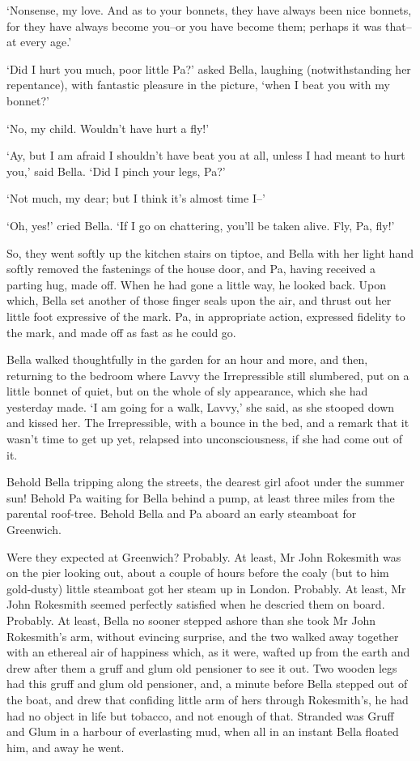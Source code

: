 ‘Nonsense, my love. And as to your bonnets, they have always been nice
bonnets, for they have always become you--or you have become them;
perhaps it was that--at every age.’

‘Did I hurt you much, poor little Pa?’ asked Bella, laughing
(notwithstanding her repentance), with fantastic pleasure in the
picture, ‘when I beat you with my bonnet?’

‘No, my child. Wouldn’t have hurt a fly!’

‘Ay, but I am afraid I shouldn’t have beat you at all, unless I had
meant to hurt you,’ said Bella. ‘Did I pinch your legs, Pa?’

‘Not much, my dear; but I think it’s almost time I--’

‘Oh, yes!’ cried Bella. ‘If I go on chattering, you’ll be taken alive.
Fly, Pa, fly!’

So, they went softly up the kitchen stairs on tiptoe, and Bella with
her light hand softly removed the fastenings of the house door, and Pa,
having received a parting hug, made off. When he had gone a little way,
he looked back. Upon which, Bella set another of those finger seals upon
the air, and thrust out her little foot expressive of the mark. Pa, in
appropriate action, expressed fidelity to the mark, and made off as fast
as he could go.

Bella walked thoughtfully in the garden for an hour and more, and then,
returning to the bedroom where Lavvy the Irrepressible still slumbered,
put on a little bonnet of quiet, but on the whole of sly appearance,
which she had yesterday made. ‘I am going for a walk, Lavvy,’ she said,
as she stooped down and kissed her. The Irrepressible, with a bounce in
the bed, and a remark that it wasn’t time to get up yet, relapsed into
unconsciousness, if she had come out of it.

Behold Bella tripping along the streets, the dearest girl afoot under
the summer sun! Behold Pa waiting for Bella behind a pump, at least
three miles from the parental roof-tree. Behold Bella and Pa aboard an
early steamboat for Greenwich.

Were they expected at Greenwich? Probably. At least, Mr John Rokesmith
was on the pier looking out, about a couple of hours before the coaly
(but to him gold-dusty) little steamboat got her steam up in London.
Probably. At least, Mr John Rokesmith seemed perfectly satisfied when
he descried them on board. Probably. At least, Bella no sooner stepped
ashore than she took Mr John Rokesmith’s arm, without evincing surprise,
and the two walked away together with an ethereal air of happiness
which, as it were, wafted up from the earth and drew after them a gruff
and glum old pensioner to see it out. Two wooden legs had this gruff and
glum old pensioner, and, a minute before Bella stepped out of the boat,
and drew that confiding little arm of hers through Rokesmith’s, he had
had no object in life but tobacco, and not enough of that. Stranded was
Gruff and Glum in a harbour of everlasting mud, when all in an instant
Bella floated him, and away he went.


